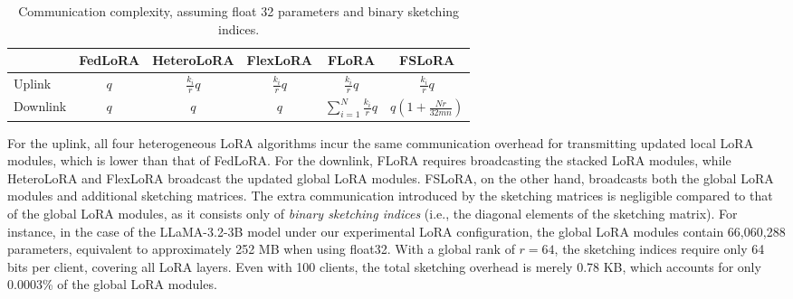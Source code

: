 \documentclass{article} %
\theoremstyle{plain}
\theoremstyle{definition}
\begin{document}
\begin{table}[h]
\centering
\caption{Communication complexity, assuming float 32 parameters and binary sketching indices.}
\begin{tabular}{lccccc}
\toprule
& {FedLoRA} & {HeteroLoRA} & {FlexLoRA} & {FLoRA} & {FSLoRA} \\
\midrule
{Uplink} & $q$ & $\frac{k_i}{r}q$ & $\frac{k_i}{r}q$ & $\frac{k_i}{r}q$ & $\frac{k_i}{r}q$ \\
{Downlink} & $q$ & $q$ & $q$ & $\sum_{i=1}^{N} \frac{k_i}{r}q $ & $q(1+\frac{Nr}{32mn})$ \\
\bottomrule
\end{tabular}
\label{tab:communication_comp}
\vspace{-2mm}
\end{table}

For the uplink, all four heterogeneous LoRA algorithms incur the same communication overhead for transmitting updated local LoRA modules, which is lower than that of FedLoRA.
For the downlink, FLoRA requires broadcasting the stacked LoRA modules, while HeteroLoRA and FlexLoRA broadcast the updated global LoRA modules. FSLoRA, on the other hand, broadcasts both the global LoRA modules and additional sketching matrices.
The extra communication introduced by the sketching matrices is negligible compared to that of the global LoRA modules, as it consists only of \emph{binary sketching indices} (i.e., the diagonal elements of the sketching matrix). For instance, in the case of the LLaMA-3.2-3B model under our experimental LoRA configuration, the global LoRA modules contain 66,060,288 parameters, equivalent to approximately 252 MB when using float32. With a global rank of $r = 64$, the sketching indices require only 64 bits per client, covering all LoRA layers. Even with 100 clients, the total sketching overhead is merely 0.78 KB, which accounts for only 0.0003\% of the global LoRA modules.
\end{document}
